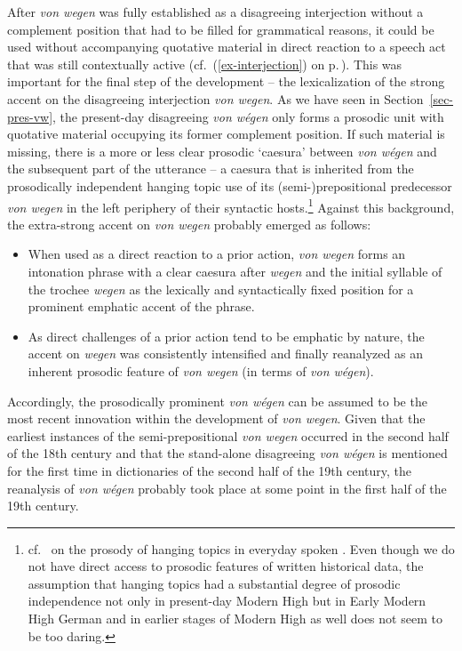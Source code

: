 \documentclass[output=paper
  ,nobabel
  ,draftmode
  ,babelshorthands
  ,colorlinks, citecolor=brown
]{langscibook}
\begin{document}
After \emph{von wegen} was fully established as a disagreeing interjection without a complement position that had to be filled for grammatical reasons, it could be used without accompanying quotative material in direct reaction to a speech act that was still contextually active (cf.\ (\ref{ex-interjection}) on p.\,\pageref{ex-interjection}). This was important for the final step of the development – the lexicalization of the strong accent on the disagreeing interjection \emph{von wegen}. As we have seen in Section~\ref{sec-pres-vw}, the present-day disagreeing \emph{von wégen} only forms a prosodic unit with quotative material occupying its former complement position. If such material is missing, there is a more or less clear prosodic `caesura' \citep{Auer2010,Barth-Weingarten2016}
between \emph{von wégen} and the subsequent part of the utterance -- a caesura that is inherited from the prosodically independent hanging topic use of its (semi-)prepositional predecessor \emph{von wegen} in the left periphery of their syntactic hosts.\footnote{cf.\ \citet{Selting1993} on the prosody of hanging topics in everyday spoken . Even though we do not have direct access to prosodic features of written historical data, the assumption that hanging topics had a substantial degree of prosodic independence not only in present-day Modern High  but in Early Modern High German and in earlier stages of Modern High  as well does not seem to be too daring.}
Against this background, the extra-strong accent on \emph{von wegen} probably emerged as follows:

\begin{itemize}
    \item When used as a direct reaction to a prior action, \emph{von wegen} forms an intonation phrase with a clear caesura after \emph{wegen} and the initial syllable of the trochee \emph{wegen} as the lexically and syntactically fixed position for a prominent emphatic accent of the phrase.
    
    \item As direct challenges of a prior action tend to be emphatic by nature, the accent on \emph{wegen} was consistently intensified and finally reanalyzed as an inherent prosodic feature of \emph{von wegen} (in terms of \emph{von wégen}).
\end{itemize}

\largerpage
\noindent
Accordingly, the prosodically prominent \emph{von wégen} can be assumed to be the most recent innovation within the development of \emph{von wegen}. Given that the earliest instances of the semi-prepositional \emph{von wegen} occurred in the second half of the 18th century and that the stand-alone disagreeing \emph{von wégen} is mentioned for the first time in dictionaries of the second half of the 19th century, the reanalysis of \emph{von wégen} probably took place at some point in the first half of the 19th century.
\end{document}
